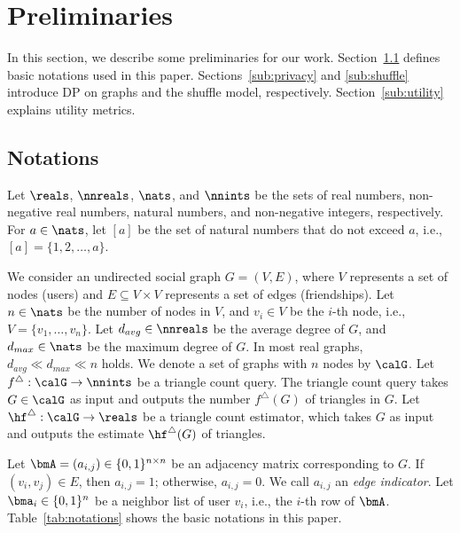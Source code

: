 \section{Preliminaries}
\label{sec:preliminaries}
In this section, we describe some preliminaries for our work. 
Section~\ref{sub:notations} defines basic notations used in this paper. 
Sections~\ref{sub:privacy} and \ref{sub:shuffle} introduce DP on graphs and the shuffle model, respectively. 
Section~\ref{sub:utility} explains utility metrics. 

\subsection{Notations}
\label{sub:notations}
Let $\reals$, $\nnreals$, $\nats$, and $\nnints$ be the sets of real numbers, non-negative real numbers, natural numbers, and non-negative integers, respectively. 
For $a\in\nats$, let $[a]$ be the set of natural numbers that do not exceed $a$, i.e., $[a] = \{1, 2, \ldots, a\}$. 

We consider an undirected social graph $G=(V,E)$, where $V$ represents a set of nodes (users) and $E \subseteq V \times V$ represents a set of edges (friendships). 
Let $n\in\nats$ be the number of nodes in $V$, and $v_i \in V$ be the $i$-th node, i.e., $V=\{v_1,\ldots,v_n\}$. 
Let $d_{avg} \in \nnreals$ be the average degree of $G$, and $d_{max} \in \nats$ be the maximum degree of $G$. 
In most real graphs, $d_{avg} \ll d_{max} \ll n$ holds. 
We denote a set of graphs with $n$ nodes by $\calG$. 
Let $f^\triangle: \calG \rightarrow \nnints$ be a triangle count query. 
The triangle count query takes $G \in \calG$ as input and outputs the number $f^\triangle(G)$ of triangles in $G$. 
Let $\hf^\triangle: \calG \rightarrow \reals$ be a triangle count estimator, which takes $G$ as input and outputs the estimate $\hf^\triangle(G)$ of triangles. 

Let $\bmA=(a_{i,j}) \in \{0,1\}^{n \times n}$ be 
an adjacency matrix corresponding to $G$. 
If $(v_i,v_j) \in E$, then $a_{i,j} = 1$; otherwise, $a_{i,j} = 0$. 
We call $a_{i,j}$ an \textit{edge indicator}. 
Let $\bma_i \in \{0,1\}^n$ be a neighbor list of user $v_i$, i.e., the $i$-th row of $\bmA$. 
Table~\ref{tab:notations} shows the basic notations in this paper. 

